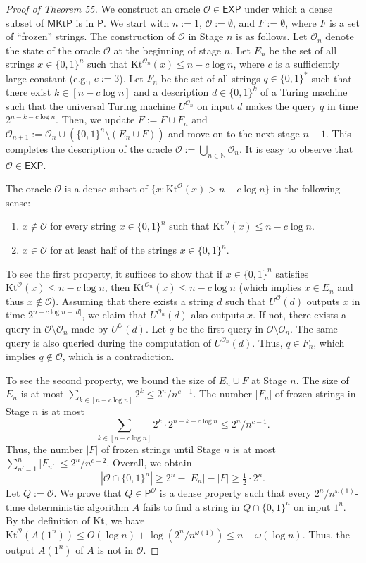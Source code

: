 \begin{proof}[Proof of Theorem 55]
We construct an oracle $\mathcal O\in\mathsf{EXP}$ under which a dense subset of $\mathsf{MKtP}$ is in $\mathsf P$. We start with $n:=1$, $\mathcal O:=\emptyset$, and $F:=\emptyset$, where $F$ is a set of ``frozen'' strings. The construction of $\mathcal O$ in Stage $n$ is as follows. Let $\mathcal O_n$ denote the state of the oracle $\mathcal O$ at the beginning of stage $n$. Let $E_n$ be the set of all strings $x\in\{0,1\}^n$ such that $\mathrm{Kt}^{\mathcal O_n}(x)\leq n-c\log n$, where $c$ is a sufficiently large constant (e.g., $c:=3$). Let $F_n$ be the set of all strings $q\in\{0,1\}^*$ such that there exist $k\in[n-c\log n]$ and a description $d\in\{0,1\}^k$ of a Turing machine such that the universal Turing machine $U^{\mathcal O_n}$ on input $d$ makes the query $q$ in time $2^{n-k-c\log n}$. Then, we update $F:=F\cup F_n$ and $\mathcal O_{n+1}:=\mathcal O_n\cup(\{0,1\}^n\setminus(E_n\cup F))$ and move on to the next stage $n+1$. This completes the description of the oracle $\mathcal O:=\bigcup_{n\in\mathbb N}\mathcal O_n$. It is easy to observe that $\mathcal O\in\mathsf{EXP}$.

The oracle $\mathcal O$ is a dense subset of $\{x:\mathrm{Kt}^{\mathcal O}(x)>n-c\log n\}$ in the following sense:
\begin{enumerate}
\item $x\notin\mathcal O$ for every string $x\in\{0,1\}^n$ such that $\mathrm{Kt}^{\mathcal O}(x)\leq n-c\log n$.
\item $x\in\mathcal O$ for at least half of the strings $x\in\{0,1\}^n$.
\end{enumerate}
To see the first property, it suffices to show that if $x\in\{0,1\}^n$ satisfies $\mathrm{Kt}^{\mathcal O}(x)\leq n-c\log n$, then $\mathrm{Kt}^{\mathcal O_n}(x)\leq n-c\log n$ (which implies $x\in E_n$ and thus $x\notin\mathcal O$). Assuming that there exists a string $d$ such that $U^{\mathcal O}(d)$ outputs $x$ in time $2^{n-c\log n-|d|}$, we claim that $U^{\mathcal O_n}(d)$ also outputs $x$. If not, there exists a query in $\mathcal O\setminus\mathcal O_n$ made by $U^{\mathcal O}(d)$. Let $q$ be the first query in $\mathcal O\setminus\mathcal O_n$. The same query is also queried during the computation of $U^{\mathcal O_n}(d)$. Thus, $q\in F_n$, which implies $q\notin\mathcal O$, which is a contradiction.

To see the second property, we bound the size of $E_n\cup F$ at Stage $n$. The size of $E_n$ is at most $\sum_{k\in[n-c\log n]}2^k\leq2^n/n^{c-1}$. The number $|F_n|$ of frozen strings in Stage $n$ is at most
\[\sum_{k\in[n-c\log n]}2^k\cdot2^{n-k-c\log n}\leq2^n/n^{c-1}.\]
Thus, the number $|F|$ of frozen strings until Stage $n$ is at most $\sum_{n'=1}^n|F_{n'}|\leq2^n/n^{c-2}$. Overall, we obtain
\[|\mathcal O\cap\{0,1\}^n|\geq2^n-|E_n|-|F|\geq\tfrac12\cdot2^n.\]
Let $Q:=\mathcal O$. We prove that $Q\in\mathsf P^{\mathcal O}$ is a dense property such that every $2^n/n^{\omega(1)}$-time deterministic algorithm $A$ fails to find a string in $Q\cap\{0,1\}^n$ on input $1^n$. By the definition of Kt, we have $\mathrm{Kt}^{\mathcal O}(A(1^n))\leq O(\log n)+\log(2^n/n^{\omega(1)})\leq n-\omega(\log n)$. Thus, the output $A(1^n)$ of $A$ is not in $\mathcal O$.


\end{proof}
